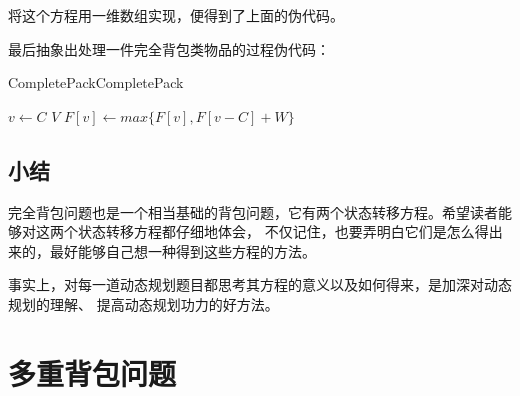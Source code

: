 \documentclass[cn, 11pt, chinese, toc=twocol]{elegantbook}
\begin{document}
将这个方程用一维数组实现，便得到了上面的伪代码。

最后抽象出处理一件完全背包类物品的过程伪代码：

\begin{definition}{CompletePack}{CompletePack}
  \begin{codebox}
      \li \For $v \gets C$ \To $V$
          \Do
       \li  $F[v] \gets max\{F[v], F[v - C] + W \}$
          \End
  \end{codebox}
  \end{definition}

\section{小结}

完全背包问题也是一个相当基础的背包问题，它有两个状态转移方程。希望读者能够对这两个状态转移方程都仔细地体会，
不仅记住，也要弄明白它们是怎么得出来的，最好能够自己想一种得到这些方程的方法。

事实上，对每一道动态规划题目都思考其方程的意义以及如何得来，是加深对动态规划的理解、
提高动态规划功力的好方法。

\chapter{多重背包问题}
\end{document}
